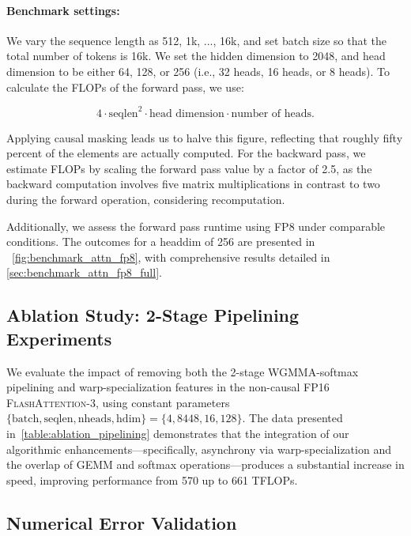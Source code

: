 \paragraph{Benchmark settings:} We vary the sequence length as 512, 1k, ..., 16k, and set batch size so that the total number of tokens is 16k. We set the hidden dimension to 2048, and head dimension to be either 64, 128, or 256 (i.e., 32 heads, 16 heads, or 8 heads). To calculate the FLOPs of the forward pass, we use:

\begin{equation*}
  4 \cdot \text{seqlen}^2 \cdot \text{head dimension} \cdot \text{number of heads}.
\end{equation*}

Applying causal masking leads us to halve this figure, reflecting that roughly fifty percent of the elements are actually computed. For the backward pass, we estimate FLOPs by scaling the forward pass value by a factor of 2.5, as the backward computation involves five matrix multiplications in contrast to two during the forward operation, considering recomputation.

Additionally, we assess the forward pass runtime using FP8 under comparable conditions. The outcomes for a headdim of 256 are presented in ~\cref{fig:benchmark_attn_fp8}, with comprehensive results detailed in \cref{sec:benchmark_attn_fp8_full}.

\subsection{Ablation Study: 2-Stage Pipelining Experiments}
\label{sec:2-stage-pipelining-experiments}

We evaluate the impact of removing both the 2-stage WGMMA-softmax pipelining and warp-specialization features in the non-causal FP16 \textsc{FlashAttention-3}, using constant parameters $\{\text{batch}, \text{seqlen}, \text{nheads}, \text{hdim}\} = \{ 4, 8448, 16, 128\}$. The data presented in~\cref{table:ablation_pipelining} demonstrates that the integration of our algorithmic enhancements—specifically, asynchrony via warp-specialization and the overlap of GEMM and softmax operations—produces a substantial increase in speed, improving performance from 570 up to 661 TFLOPs.

\subsection{Numerical Error Validation}
\label{sec:numerical_error}

